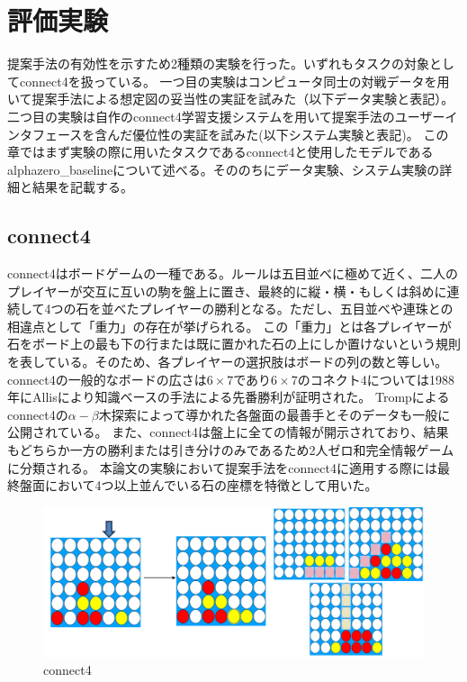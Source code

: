 \chapter{評価実験}
提案手法の有効性を示すため2種類の実験を行った。いずれもタスクの対象としてconnect4を扱っている。
一つ目の実験はコンピュータ同士の対戦データを用いて提案手法による想定図の妥当性の実証を試みた（以下データ実験と表記）。
二つ目の実験は自作のconnect4学習支援システムを用いて提案手法のユーザーインタフェースを含んだ優位性の実証を試みた(以下システム実験と表記)。
この章ではまず実験の際に用いたタスクであるconnect4と使用したモデルであるalphazero\_baselineについて述べる。そののちにデータ実験、システム実験の詳細と結果を記載する。
\section{connect4}
connect4\cite{connect4}はボードゲームの一種である。ルールは五目並べに極めて近く、二人のプレイヤーが交互に互いの駒を盤上に置き、最終的に縦・横・もしくは斜めに連続して4つの石を並べたプレイヤーの勝利となる。ただし、五目並べや連珠との相違点として「重力」の存在が挙げられる。
この「重力」とは各プレイヤーが石をボード上の最も下の行または既に置かれた石の上にしか置けないという規則を表している。そのため、各プレイヤーの選択肢はボードの列の数と等しい。
connect4の一般的なボードの広さは$6\times7$であり$6\times7$のコネクト4については1988年にAllis\cite{allis}により知識ベースの手法による先番勝利が証明された。
Tromp\cite{data}によるconnect4の$\alpha-\beta$木探索によって導かれた各盤面の最善手とそのデータも一般に公開されている。
また、connect4は盤上に全ての情報が開示されており、結果もどちらか一方の勝利または引き分けのみであるため2人ゼロ和完全情報ゲームに分類される。
本論文の実験において提案手法をconnect4に適用する際には最終盤面において4つ以上並んでいる石の座標を特徴として用いた。
\begin{figure}[t]
	\centering
    \includegraphics[trim={0cm 0cm 0cm 0cm},clip]{./figure/connect4.png}
	\caption{connect4}
	\label{fig:connect4}
\end{figure}
